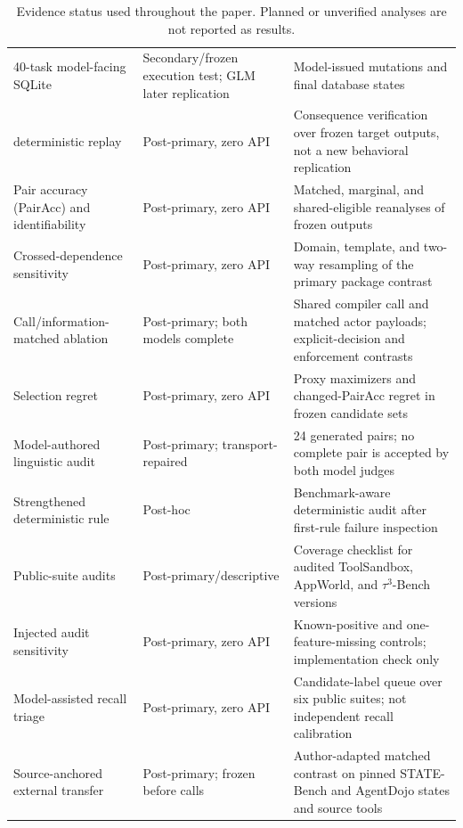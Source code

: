 \documentclass[10pt]{article}
\begin{document}
\begin{table}[H]
\begin{tabular}{p{}p{}p{}}
40-task model-facing SQLite & Secondary/frozen execution test; GLM later replication & Model-issued mutations and final database states \\
\NewSchemaReplication{} deterministic replay & Post-primary, zero API & Consequence verification over frozen target outputs, not a new behavioral replication \\
Pair accuracy (PairAcc) and identifiability & Post-primary, zero API & Matched, marginal, and shared-eligible reanalyses of frozen outputs \\
Crossed-dependence sensitivity & Post-primary, zero API & Domain, template, and two-way resampling of the primary package contrast \\
Call/information-matched ablation & Post-primary; both models complete & Shared compiler call and matched actor payloads; explicit-decision and enforcement contrasts \\
Selection regret & Post-primary, zero API & Proxy maximizers and changed-PairAcc regret in frozen candidate sets \\
Model-authored linguistic audit & Post-primary; transport-repaired & 24 generated pairs; no complete pair is accepted by both model judges \\
Strengthened deterministic rule & Post-hoc & Benchmark-aware deterministic audit after first-rule failure inspection \\
Public-suite audits & Post-primary/descriptive & Coverage checklist for audited ToolSandbox, AppWorld, and $\tau^3$-Bench versions \\
Injected audit sensitivity & Post-primary, zero API & Known-positive and one-feature-missing controls; implementation check only \\
Model-assisted recall triage & Post-primary, zero API & Candidate-label queue over six public suites; not independent recall calibration \\
Source-anchored external transfer & Post-primary; frozen before calls & Author-adapted matched contrast on pinned STATE-Bench and AgentDojo states and source tools \\
\bottomrule
\end{tabular}
\caption{Evidence status used throughout the paper. Planned or unverified analyses are not
reported as results.}
\label{tab:supp-chronology}
\end{table}
\end{document}
